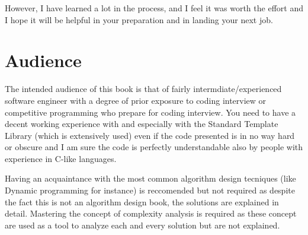 However, I have learned a lot in the process, and I feel it was worth the effort and I hope it will be helpful in your preparation and in landing your next job. 

\section*{Audience}
The intended audience of this book is that of fairly intermdiate/experienced software engineer with a degree of prior exposure to coding interview or competitive programming who prepare for coding interview.
You need to have a decent working experience with \CC and especially with the Standard Template Library (which is extensively used) even if the code presented is in no way hard or obscure \CC and I am sure the code is perfectly understandable also by people with experience in C-like languages. 

Having an acquaintance with the most common algorithm design tecniques (like Dynamic programming for instance) is reccomended but not required as despite the fact this is not an algorithm design book, the solutions are explained in detail. Mastering the concept of complexity analysis is required as these concept are used as a tool to analyze each and every solution but are not explained.



